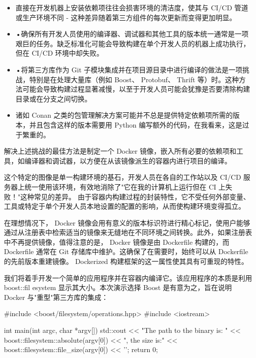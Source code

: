 \begin{itemize}
\item
直接在开发机器上安装依赖项往往会损害环境的清洁度，使其与 CI/CD 管道或生产环境不同 - 这种差异随着第三方组件的每次更新而变得更加明显。

\item
•确保所有开发人员使用的编译器、调试器和其他工具的版本统一通常是一项艰巨的任务。缺乏标准化可能会导致构建在单个开发人员的机器上成功执行，但在 CI/CD 环境中却失败。

\item
•将第三方库作为 Git 子模块集成并在项目源目录中进行编译的做法是一项挑战，特别是在处理大量库（例如 Boost、 Protobuf、 Thrift 等）时。这种方法可能会导致构建过程显著减慢，以至于开发人员可能会犹豫是否要清除构建目录或在分支之间切换。

\item
诸如 Conan 之类的包管理解决方案可能并不总是提供特定依赖项所需的版本，并且包含这样的版本需要用 Python 编写额外的代码，在我看来，这是过于繁重的。
\end{itemize}


解决上述挑战的最佳方法是制定一个 Docker 镜像，嵌入所有必要的依赖项和工具，如编译器和调试器，以方便在从该镜像派生的容器内进行项目的编译。

这个特定的图像是单一构建环境的基石，开发人员在各自的工作站以及 CI/CD 服务器上统一使用该环境，有效地消除了"它在我的计算机上运行但在 CI 上失败！"这种常见的差异。
由于容器内构建过程的封装特性，它不受任何外部变量、工具或特定于单个开发人员本地设置的配置的影响，从而使构建环境变得孤立。

在理想情况下， Docker 镜像会用有意义的版本标识符进行精心标记，使用户能够通过从注册表中检索适当的镜像来无缝地在不同环境之间转换。此外，如果注册表中不再提供镜像，值得注意的是， Docker 镜像是由 Dockerfile 构建的，而 Dockerfile 通常在 Git 存储库中维护。这确保了在需要时，始终可以从 Dockerfile 的先前版本重建镜像。 Dockerized 构建框架的这一属性使其具有可重现的特性。


我们将着手开发一个简单的应用程序并在容器内编译它。该应用程序的本质是利用 boost::fil esystem 显示其大小。本次演示选择 Boost 是有意为之，旨在说明 Docker 与"重型"第三方库的集成：

\begin{cpp}
#include <boost/filesystem/operations.hpp>
#include <iostream>

int main(int argc, char *argv[]) {
    std::cout << "The path to the binary is: "
              << boost::filesystem::absolute(argv[0])
              << ", the size is:" << boost::filesystem::file_size(argv[0]) << '\n';
    return 0;
}
\end{cpp}

